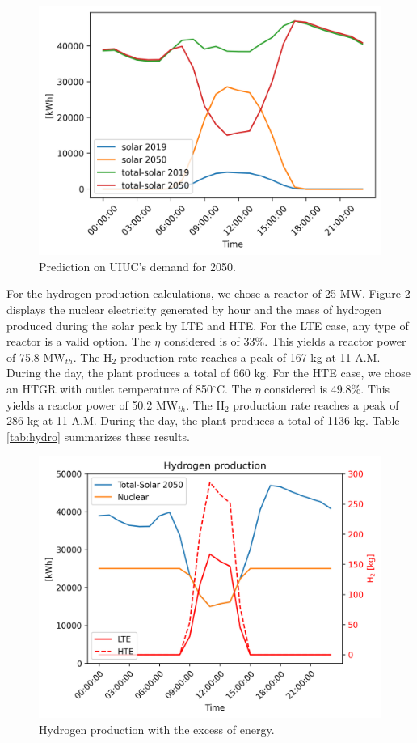 \documentclass{anstrans}
\begin{document}
\begin{figure}[htbp!]
	\centering
	\includegraphics[width=1.0\linewidth]{figures/uiuc-duck.png}
	\hfill
	\caption{Prediction on UIUC's demand for 2050.}
	\label{fig:uiuc-duck}
\end{figure}

For the hydrogen production calculations, we chose a reactor of 25 MW.
Figure \ref{fig:uiuc-hydro2} displays the nuclear electricity generated by hour and the mass of hydrogen produced during the solar peak by \gls{LTE} and \gls{HTE}.
For the \gls{LTE} case, any type of reactor is a valid option.
The $\eta$ considered is of 33$\%$.
This yields a reactor power of 75.8 MW$_{th}$.
The H$_2$ production rate reaches a peak of 167 kg at 11 A.M.
During the day, the plant produces a total of 660 kg.
For the \gls{HTE} case, we chose an \gls{HTGR} with outlet temperature of 850$^{\circ}$C.
The $\eta$ considered is 49.8$\%$.
This yields a reactor power of 50.2 MW$_{th}$.
The H$_2$ production rate reaches a peak of 286 kg at 11 A.M.
During the day, the plant produces a total of 1136 kg.
Table \ref{tab:hydro} summarizes these results.

\begin{figure}[htbp!]
	\centering
	\includegraphics[width=1.0\linewidth]{figures/uiuc-hydro2.png}
	\hfill
	\caption{Hydrogen production with the excess of energy.}
	\label{fig:uiuc-hydro2}
\end{figure}
\end{document}
